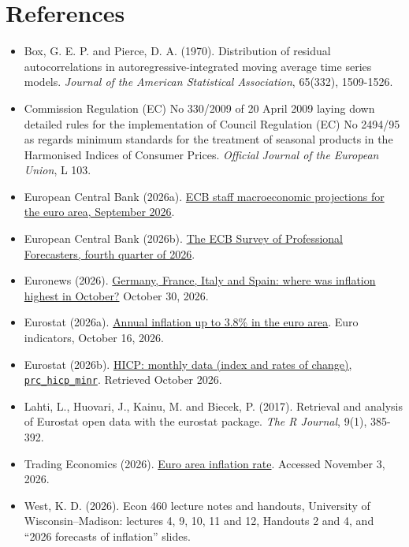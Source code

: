 \documentclass[11pt]{article}
\begin{document}
\section*{References}
\small
\begin{itemize}\setlength{\itemsep}{1pt}
\item[] Box, G. E. P. and Pierce, D. A. (1970). Distribution of residual autocorrelations in autoregressive-integrated moving average time series models. \emph{Journal of the American Statistical Association}, 65(332), 1509-1526.
\item[] Commission Regulation (EC) No 330/2009 of 20 April 2009 laying down detailed rules for the implementation of Council Regulation (EC) No 2494/95 as regards minimum standards for the treatment of seasonal products in the Harmonised Indices of Consumer Prices. \emph{Official Journal of the European Union}, L 103.
\item[] European Central Bank (2026a). \href{https://www.ecb.europa.eu/press/projections/html/ecb.projections202609_ecbstaff~8e340fc69d.en.html}{ECB staff macroeconomic projections for the euro area, September 2026}.
\item[] European Central Bank (2026b). \href{https://www.ecb.europa.eu/stats/ecb_surveys/survey_of_professional_forecasters/html/ecb.spf2026q4.en.html}{The ECB Survey of Professional Forecasters, fourth quarter of 2026}.
\item[] Euronews (2026). \href{https://www.euronews.com/2026/10/30/germany-france-italy-and-spain-where-was-inflation-highest-in-october}{Germany, France, Italy and Spain: where was inflation highest in October?} October 30, 2026.
\item[] Eurostat (2026a). \href{https://ec.europa.eu/eurostat/web/products-euro-indicators/w/2-16102026-ap}{Annual inflation up to 3.8\% in the euro area}. Euro indicators, October 16, 2026.
\item[] Eurostat (2026b). \href{https://ec.europa.eu/eurostat/databrowser/view/prc_hicp_minr/default/table}{HICP: monthly data (index and rates of change), \texttt{prc\_hicp\_minr}}. Retrieved October 2026.
\item[] Lahti, L., Huovari, J., Kainu, M. and Biecek, P. (2017). Retrieval and analysis of Eurostat open data with the eurostat package. \emph{The R Journal}, 9(1), 385-392.
\item[] Trading Economics (2026). \href{https://tradingeconomics.com/euro-area/inflation-cpi}{Euro area inflation rate}. Accessed November 3, 2026.
\item[] West, K. D. (2026). Econ 460 lecture notes and handouts, University of Wisconsin--Madison: lectures 4, 9, 10, 11 and 12, Handouts 2 and 4, and ``2026 forecasts of inflation'' slides.
\end{itemize}
\normalsize
\end{document}
